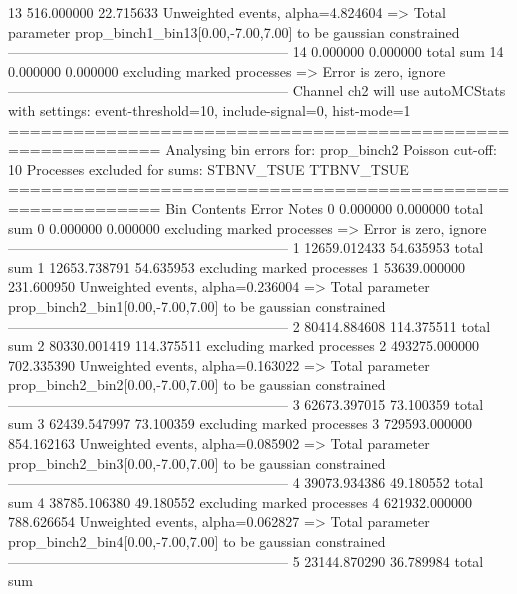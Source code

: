 13         516.000000      22.715633       Unweighted events, alpha=4.824604
  => Total parameter prop_binch1_bin13[0.00,-7.00,7.00] to be gaussian constrained
------------------------------------------------------------
14         0.000000        0.000000        total sum                     
14         0.000000        0.000000        excluding marked processes    
  => Error is zero, ignore      
------------------------------------------------------------
Channel ch2 will use autoMCStats with settings: event-threshold=10, include-signal=0, hist-mode=1
============================================================
Analysing bin errors for: prop_binch2
Poisson cut-off: 10
Processes excluded for sums: STBNV_TSUE TTBNV_TSUE
============================================================
Bin        Contents        Error           Notes                         
0          0.000000        0.000000        total sum                     
0          0.000000        0.000000        excluding marked processes    
  => Error is zero, ignore      
------------------------------------------------------------
1          12659.012433    54.635953       total sum                     
1          12653.738791    54.635953       excluding marked processes    
1          53639.000000    231.600950      Unweighted events, alpha=0.236004
  => Total parameter prop_binch2_bin1[0.00,-7.00,7.00] to be gaussian constrained
------------------------------------------------------------
2          80414.884608    114.375511      total sum                     
2          80330.001419    114.375511      excluding marked processes    
2          493275.000000   702.335390      Unweighted events, alpha=0.163022
  => Total parameter prop_binch2_bin2[0.00,-7.00,7.00] to be gaussian constrained
------------------------------------------------------------
3          62673.397015    73.100359       total sum                     
3          62439.547997    73.100359       excluding marked processes    
3          729593.000000   854.162163      Unweighted events, alpha=0.085902
  => Total parameter prop_binch2_bin3[0.00,-7.00,7.00] to be gaussian constrained
------------------------------------------------------------
4          39073.934386    49.180552       total sum                     
4          38785.106380    49.180552       excluding marked processes    
4          621932.000000   788.626654      Unweighted events, alpha=0.062827
  => Total parameter prop_binch2_bin4[0.00,-7.00,7.00] to be gaussian constrained
------------------------------------------------------------
5          23144.870290    36.789984       total sum                     
